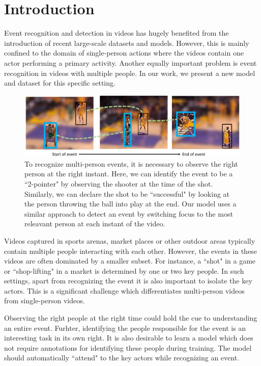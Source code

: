 \section{Introduction}

Event recognition and detection in videos has hugely benefited from the
introduction of recent large-scale datasets \cite{THUMOS,UCF101,Karpathy_CVPR14,MED11} and models.
However, this is mainly confined to the domain of single-person actions
where the videos contain one actor performing a primary activity.
Another equally important problem is event recognition in
videos with multiple people. In our work, we present a new model
and dataset for this specific setting.

\begin{figure}[ht!]
\begin{center}
  \includegraphics[width=3.5 in]{images/pull_figure_v2_cropped.pdf}
\end{center}
\caption{To recognize multi-person events, it is necessary to observe the right
person at the right instant. Here, we can identify the
event to be a ``2-pointer" by observing the shooter at the time of the shot.
Similarly, we can declare the shot to be ``successful" by looking at the
person throwing the ball into play at the end. Our model uses a similar approach to detect
an event by switching focus to the most releavant person at each instant of the video.}
\label{fig:pull_figure}
\end{figure}

Videos captured in sports arenas, market places or other outdoor areas
typically contain multiple people interacting with each other.
However, the events in these videos are often
dominated by a smaller subset. For instance, a ``shot" in a game
or ``shop-lifting" in a market is determined by one or two key people.
In such settings, apart from recognizing the event it is also important
to isolate the key actors. This is a significant challenge which
differentiates multi-person videos from single-person videos.

Observing the right people at the right time could hold the cue to
understanding an entire event. Furhter, identifying the people responsible for
the event is an interesting task in its own right.  It is also desirable to
learn a model which does not require annotations for identifying these people during
training. The model should automatically ``attend" to the key actors while recognizing an event.


